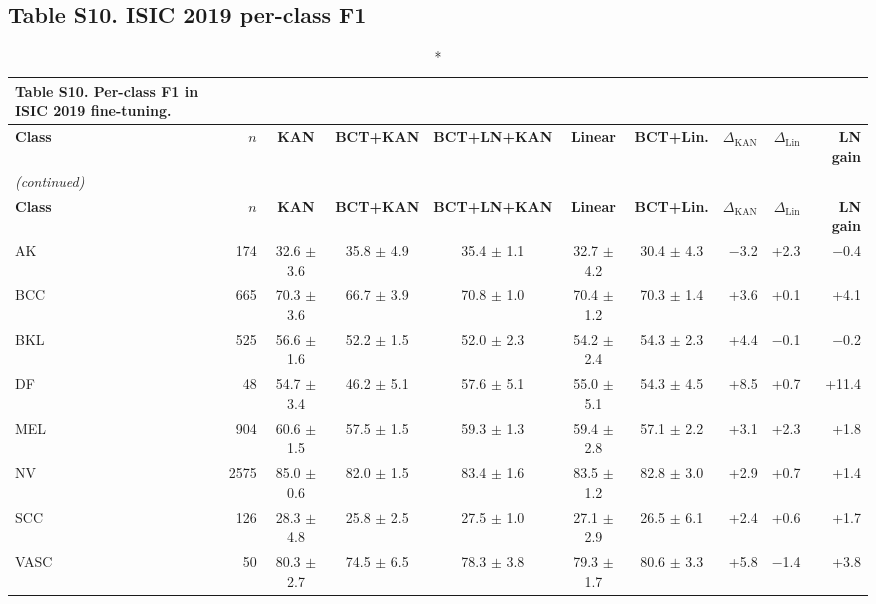 \documentclass[10pt]{article}
\begin{document}
\subsection*{Table S10. ISIC 2019 per-class F1}
\scriptsize
\setlength{\tabcolsep}{3pt}
\begin{longtable}{lrcccccrrr}
\caption*{\textbf{Table S10.} Per-class F1 in ISIC 2019 fine-tuning.}\\
\toprule
\textbf{Class} & \textbf{$n$} & \textbf{KAN} & \textbf{BCT+KAN} & \textbf{BCT+LN+KAN} & \textbf{Linear} & \textbf{BCT+Lin.} & \textbf{$\Delta_{\mathrm{KAN}}$} & \textbf{$\Delta_{\mathrm{Lin}}$} & \textbf{LN gain} \\
\midrule
\endfirsthead
\multicolumn{10}{l}{\textit{(continued)}}\\
\toprule
\textbf{Class} & \textbf{$n$} & \textbf{KAN} & \textbf{BCT+KAN} & \textbf{BCT+LN+KAN} & \textbf{Linear} & \textbf{BCT+Lin.} & \textbf{$\Delta_{\mathrm{KAN}}$} & \textbf{$\Delta_{\mathrm{Lin}}$} & \textbf{LN gain} \\
\midrule
\endhead
\bottomrule
\endfoot
AK & 174 & 32.6 $\pm$ 3.6 & 35.8 $\pm$ 4.9 & 35.4 $\pm$ 1.1 & 32.7 $\pm$ 4.2 & 30.4 $\pm$ 4.3 & $-$3.2 & +2.3 & $-$0.4 \\
BCC & 665 & 70.3 $\pm$ 3.6 & 66.7 $\pm$ 3.9 & 70.8 $\pm$ 1.0 & 70.4 $\pm$ 1.2 & 70.3 $\pm$ 1.4 & +3.6 & +0.1 & +4.1 \\
BKL & 525 & 56.6 $\pm$ 1.6 & 52.2 $\pm$ 1.5 & 52.0 $\pm$ 2.3 & 54.2 $\pm$ 2.4 & 54.3 $\pm$ 2.3 & +4.4 & $-$0.1 & $-$0.2 \\
DF & 48 & 54.7 $\pm$ 3.4 & 46.2 $\pm$ 5.1 & 57.6 $\pm$ 5.1 & 55.0 $\pm$ 5.1 & 54.3 $\pm$ 4.5 & +8.5 & +0.7 & +11.4 \\
MEL & 904 & 60.6 $\pm$ 1.5 & 57.5 $\pm$ 1.5 & 59.3 $\pm$ 1.3 & 59.4 $\pm$ 2.8 & 57.1 $\pm$ 2.2 & +3.1 & +2.3 & +1.8 \\
NV & 2575 & 85.0 $\pm$ 0.6 & 82.0 $\pm$ 1.5 & 83.4 $\pm$ 1.6 & 83.5 $\pm$ 1.2 & 82.8 $\pm$ 3.0 & +2.9 & +0.7 & +1.4 \\
SCC & 126 & 28.3 $\pm$ 4.8 & 25.8 $\pm$ 2.5 & 27.5 $\pm$ 1.0 & 27.1 $\pm$ 2.9 & 26.5 $\pm$ 6.1 & +2.4 & +0.6 & +1.7 \\
VASC & 50 & 80.3 $\pm$ 2.7 & 74.5 $\pm$ 6.5 & 78.3 $\pm$ 3.8 & 79.3 $\pm$ 1.7 & 80.6 $\pm$ 3.3 & +5.8 & $-$1.4 & +3.8 \\
\end{longtable}
\normalsize
\end{document}
